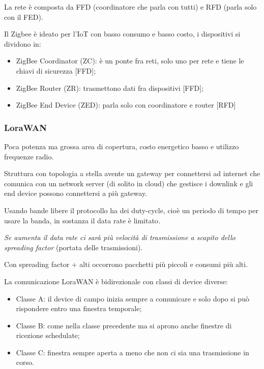 La rete è composta da FFD (coordinatore che parla con tutti) e RFD
(parla solo con il FED).

Il Zigbee è ideato per l'IoT con basso consumo e basso costo, i
dispositivi si dividono in:

\begin{itemize}
\item
  ZigBee Coordinator (ZC): è un ponte fra reti, solo uno per rete e
  tiene le chiavi di sicurezza {[}FFD{]};
\item
  ZigBee Router (ZR): trasmettono dati fra dispositivi {[}FFD{]};
\item
  ZigBee End Device (ZED): parla solo con coordinatore e router
  {[}RFD{]}
\end{itemize}

\subsubsection{LoraWAN}\label{lorawan}

Poca potenza ma grossa area di copertura, costo energetico basso e
utilizzo frequenze radio.

Struttura con topologia a stella avente un gateway per connettersi ad
internet che comunica con un network server (di solito in cloud) che
gestisce i downlink e gli end device possono connettersi a più gateway.

Usando bande libere il protocollo ha dei duty-cycle, cioè un periodo di
tempo per usare la banda, in sostanza il data rate è limitato\emph{.}

\emph{Se aumenta il data rate ci sarà più velocità di trasmissione a
scapito dello spreading factor} (portata delle trasmissioni).

Con spreading factor + alti occorrono pacchetti più piccoli e consumi
più alti.

La comunicazione LoraWAN è bidirezionale con classi di device diverse:

\begin{itemize}
\item
  Classe A: il device di campo inizia sempre a comunicare e solo dopo si
  può rispondere entro una finestra temporale;
\item
  Classe B: come nella classe precedente ma si aprono anche finestre di
  ricezione schedulate;
\item
  Classe C: finestra sempre aperta a meno che non ci sia una
  trasmissione in corso.
\end{itemize}

